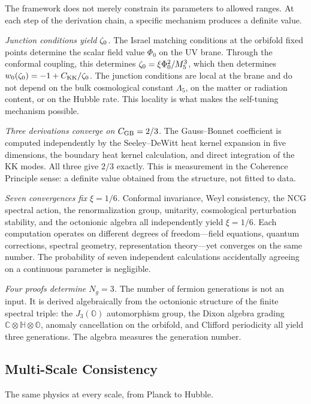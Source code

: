 The framework does not merely constrain its parameters to allowed
ranges. At each step of the derivation chain, a specific mechanism
produces a definite value.

\textit{Junction conditions yield $\zeta_0$.} The Israel matching
conditions at the orbifold fixed points determine the scalar field
value $\Phi_0$ on the UV brane. Through the conformal coupling, this
determines $\zeta_0 = \xi \Phi_0^2 / M_5^3$, which then determines
$w_0(\zeta_0) = -1 + C_{\mathrm{KK}} / \zeta_0$. The junction conditions are local at the
brane and do not depend on the bulk cosmological constant $\Lambda_5$,
on the matter or radiation content, or on the Hubble rate. This
locality is what makes the self-tuning mechanism possible.

\textit{Three derivations converge on $C_{\mathrm{GB}} = 2/3$.} The Gauss--Bonnet
coefficient is computed independently by the Seeley--DeWitt heat
kernel expansion in five dimensions, the boundary heat kernel
calculation, and direct integration of the KK modes. All three give
$2/3$ exactly. This is measurement in the Coherence Principle sense:
a definite value obtained from the structure, not fitted to data.

\textit{Seven convergences fix $\xi = 1/6$.} Conformal invariance,
Weyl consistency, the NCG spectral action, the renormalization group,
unitarity, cosmological perturbation stability, and the octonionic
algebra all independently yield $\xi = 1/6$. Each computation operates
on different degrees of freedom---field equations, quantum corrections,
spectral geometry, representation theory---yet converges on the same
number. The probability of seven independent calculations accidentally
agreeing on a continuous parameter is negligible.

\textit{Four proofs determine $N_g = 3$.} The number of fermion
generations is not an input. It is derived algebraically from the
octonionic structure of the finite spectral triple: the
$J_3(\mathbb{O})$ automorphism group, the Dixon algebra grading
$\mathbb{C} \otimes \mathbb{H} \otimes \mathbb{O}$, anomaly
cancellation on the orbifold, and Clifford periodicity all yield three
generations. The algebra measures the generation number.

\subsection{Multi-Scale Consistency}
\label{sec:0-multiscale}

The same physics at every scale, from Planck to Hubble.

